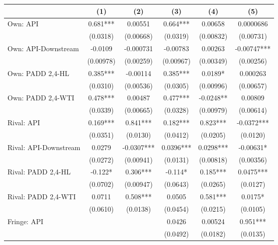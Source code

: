 {
\def\sym#1{\ifmmode^{#1}\else\(^{#1}\)\fi}
\begin{tabular}{l*{5}{c}}
\toprule
                &\multicolumn{1}{c}{(1)}   &\multicolumn{1}{c}{(2)}   &\multicolumn{1}{c}{(3)}   &\multicolumn{1}{c}{(4)}   &\multicolumn{1}{c}{(5)}   \\
\midrule
Own: API        &    0.681***&  0.00551   &    0.664***&  0.00658   &0.0000686   \\
                & (0.0318)   &(0.00668)   & (0.0319)   &(0.00832)   &(0.00731)   \\
\addlinespace
Own: API-Downstream&  -0.0109   &-0.000731   & -0.00783   &  0.00263   & -0.00747***\\
                &(0.00978)   &(0.00259)   &(0.00967)   &(0.00349)   &(0.00256)   \\
\addlinespace
Own: PADD 2,4-HL&    0.385***& -0.00114   &    0.385***&   0.0189*  & 0.000263   \\
                & (0.0310)   &(0.00536)   & (0.0305)   &(0.00996)   &(0.00657)   \\
\addlinespace
Own: PADD 2,4-WTI&    0.478***&  0.00487   &    0.477***&  -0.0248** &  0.00809   \\
                & (0.0339)   &(0.00665)   & (0.0328)   &(0.00979)   &(0.00614)   \\
\addlinespace
Rival: API      &    0.169***&    0.841***&    0.182***&    0.823***&  -0.0372***\\
                & (0.0351)   & (0.0130)   & (0.0412)   & (0.0205)   & (0.0120)   \\
\addlinespace
Rival: API-Downstream&   0.0279   &  -0.0307***&   0.0396***&   0.0298***& -0.00631*  \\
                & (0.0272)   &(0.00941)   & (0.0131)   &(0.00818)   &(0.00356)   \\
\addlinespace
Rival: PADD 2,4-HL&   -0.122*  &    0.306***&   -0.114*  &    0.185***&   0.0475***\\
                & (0.0702)   &(0.00947)   & (0.0643)   & (0.0265)   & (0.0127)   \\
\addlinespace
Rival: PADD 2,4-WTI&   0.0711   &    0.508***&   0.0505   &    0.581***&   0.0175*  \\
                & (0.0610)   & (0.0138)   & (0.0454)   & (0.0215)   & (0.0105)   \\
\addlinespace
Fringe: API     &            &            &   0.0426   &  0.00524   &    0.951***\\
                &            &            & (0.0492)   & (0.0182)   & (0.0135)   \\

\end{tabular}}
